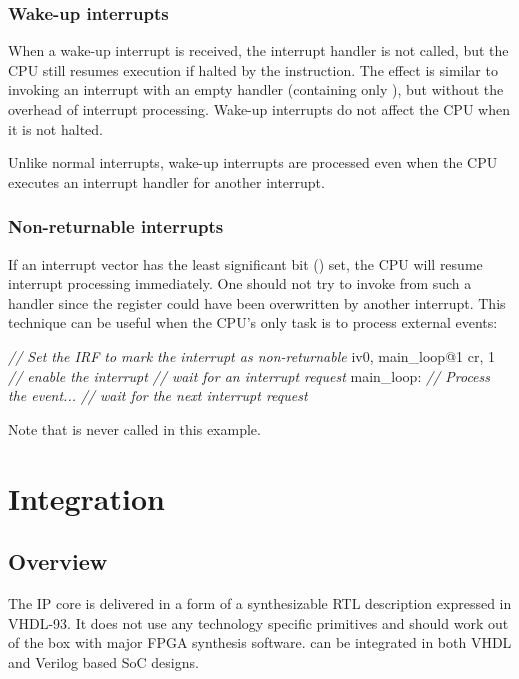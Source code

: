 \documentclass[a4paper,12pt,twoside,extrafontsizes]{memoir}
\begin{document}
\subsection{Wake-up interrupts}

When a wake-up interrupt is received, the interrupt handler is not called, but the CPU still resumes execution if halted by the  instruction. The effect is similar to invoking an interrupt with an empty handler (containing only ), but without the overhead of interrupt processing. Wake-up interrupts do not affect the CPU when it is not halted.

Unlike normal interrupts, wake-up interrupts are processed even when the CPU executes an interrupt handler for another interrupt.

\subsection{Non-returnable interrupts}

If an interrupt vector has the least significant bit () set, the CPU will resume interrupt processing immediately. One should not try to invoke  from such a handler since the  register could have been overwritten by another interrupt. This technique can be useful when the CPU's only task is to process external events:

\begin{codeparbreakable}
\emph{// Set the IRF to mark the interrupt as non-returnable}
     iv0, main\_loop@1
     cr, 1 \emph{// enable the interrupt}
     \emph{// wait for an interrupt request}
main\_loop:
\emph{// Process the event...}
     \emph{// wait for the next interrupt request}
\end{codeparbreakable}

Note that  is never called in this example.

\chapter{Integration}
\label{ch:integration}

\section{Overview}

The \lxp{} IP core is delivered in a form of a synthesizable RTL description expressed in \mbox{VHDL-93}. It does not use any technology specific primitives and should work out of the box with major FPGA synthesis software. \lxp{} can be integrated in both VHDL and Verilog\textregistered{} based SoC designs.
\end{document}
